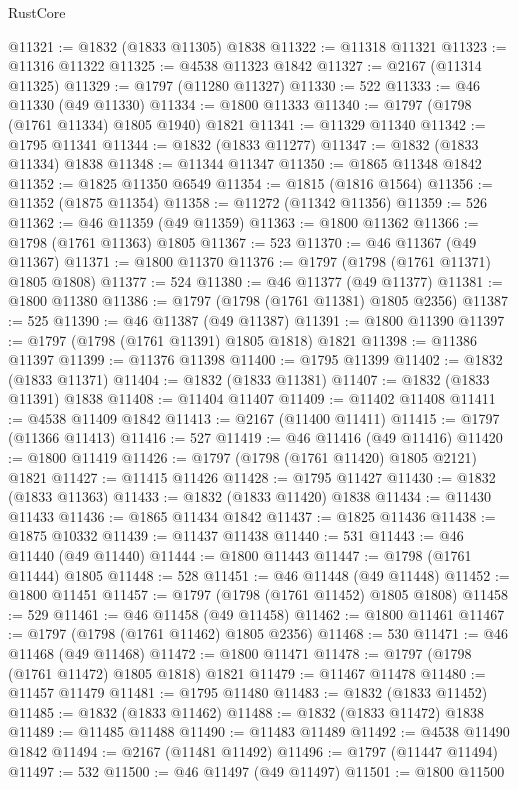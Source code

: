 \begin{lexlean}{RustCore}
\begin{coremodule}
@11321 := @1832 (@1833 @11305) @1838
@11322 := @11318 @11321
@11323 := @11316 @11322
@11325 := @4538 @11323 @1842
@11327 := @2167 (@11314 @11325)
@11329 := @1797 (@11280 @11327)
@11330 := 522
@11333 := @46 @11330 (@49 @11330)
@11334 := @1800 @11333
@11340 := @1797 (@1798 (@1761 @11334) @1805 @1940) @1821
@11341 := @11329 @11340
@11342 := @1795 @11341
@11344 := @1832 (@1833 @11277)
@11347 := @1832 (@1833 @11334) @1838
@11348 := @11344 @11347
@11350 := @1865 @11348 @1842
@11352 := @1825 @11350 @6549
@11354 := @1815 (@1816 @1564)
@11356 := @11352 (@1875 @11354)
@11358 := @11272 (@11342 @11356)
@11359 := 526
@11362 := @46 @11359 (@49 @11359)
@11363 := @1800 @11362
@11366 := @1798 (@1761 @11363) @1805
@11367 := 523
@11370 := @46 @11367 (@49 @11367)
@11371 := @1800 @11370
@11376 := @1797 (@1798 (@1761 @11371) @1805 @1808)
@11377 := 524
@11380 := @46 @11377 (@49 @11377)
@11381 := @1800 @11380
@11386 := @1797 (@1798 (@1761 @11381) @1805 @2356)
@11387 := 525
@11390 := @46 @11387 (@49 @11387)
@11391 := @1800 @11390
@11397 := @1797 (@1798 (@1761 @11391) @1805 @1818) @1821
@11398 := @11386 @11397
@11399 := @11376 @11398
@11400 := @1795 @11399
@11402 := @1832 (@1833 @11371)
@11404 := @1832 (@1833 @11381)
@11407 := @1832 (@1833 @11391) @1838
@11408 := @11404 @11407
@11409 := @11402 @11408
@11411 := @4538 @11409 @1842
@11413 := @2167 (@11400 @11411)
@11415 := @1797 (@11366 @11413)
@11416 := 527
@11419 := @46 @11416 (@49 @11416)
@11420 := @1800 @11419
@11426 := @1797 (@1798 (@1761 @11420) @1805 @2121) @1821
@11427 := @11415 @11426
@11428 := @1795 @11427
@11430 := @1832 (@1833 @11363)
@11433 := @1832 (@1833 @11420) @1838
@11434 := @11430 @11433
@11436 := @1865 @11434 @1842
@11437 := @1825 @11436
@11438 := @1875 @10332
@11439 := @11437 @11438
@11440 := 531
@11443 := @46 @11440 (@49 @11440)
@11444 := @1800 @11443
@11447 := @1798 (@1761 @11444) @1805
@11448 := 528
@11451 := @46 @11448 (@49 @11448)
@11452 := @1800 @11451
@11457 := @1797 (@1798 (@1761 @11452) @1805 @1808)
@11458 := 529
@11461 := @46 @11458 (@49 @11458)
@11462 := @1800 @11461
@11467 := @1797 (@1798 (@1761 @11462) @1805 @2356)
@11468 := 530
@11471 := @46 @11468 (@49 @11468)
@11472 := @1800 @11471
@11478 := @1797 (@1798 (@1761 @11472) @1805 @1818) @1821
@11479 := @11467 @11478
@11480 := @11457 @11479
@11481 := @1795 @11480
@11483 := @1832 (@1833 @11452)
@11485 := @1832 (@1833 @11462)
@11488 := @1832 (@1833 @11472) @1838
@11489 := @11485 @11488
@11490 := @11483 @11489
@11492 := @4538 @11490 @1842
@11494 := @2167 (@11481 @11492)
@11496 := @1797 (@11447 @11494)
@11497 := 532
@11500 := @46 @11497 (@49 @11497)
@11501 := @1800 @11500

\end{coremodule}
\end{lexlean}
